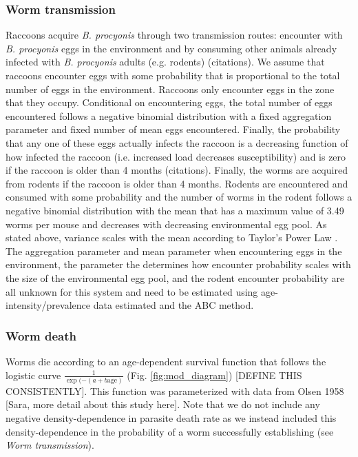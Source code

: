 \documentclass[11pt]{article}
\begin{document}
\subsubsection{Worm transmission}

Raccoons acquire \emph{B. procyonis} through two transmission routes:
encounter with \emph{B. procyonis} eggs in the environment and by
consuming other animals already infected with \emph{B. procyonis} adults
(e.g. rodents) (citations).  We assume that raccoons encounter eggs with some probability that is proportional to the total number of eggs in the environment. Raccoons only encounter eggs in the zone that they occupy. Conditional on encountering eggs, the total number of eggs encountered follows a negative binomial distribution with a fixed aggregation parameter and fixed number of mean eggs encountered.  Finally, the probability that any one of these eggs actually infects the raccoon is a decreasing function of how infected the raccoon (i.e. increased load decreases susceptibility) and is zero if the raccoon is older than 4 months (citations). Finally, the worms are acquired from rodents if the raccoon is older than 4 months.  Rodents are encountered and consumed with some probability and the number of worms in the rodent follows a negative binomial distribution with the mean that has a maximum value of 3.49 worms per mouse and decreases with decreasing environmental egg pool. As stated above, variance scales with the mean according to Taylor's Power Law \citep{Shaw1995}.  The aggregation parameter and mean parameter when encountering eggs in the environment, the parameter the determines how encounter probability scales with the size of the environmental egg pool, and the rodent encounter probability are all unknown for this system and need to be estimated using age-intensity/prevalence data estimated and the ABC method.

\subsubsection{Worm death}

Worms die according to an age-dependent survival function that follows the logistic curve $\frac{1}{\exp(-(a + b \text{age})}$ (Fig. \ref{fig:mod_diagram}) [DEFINE THIS CONSISTENTLY]. This function was parameterized with data from Olsen 1958 [Sara, more detail about this study here].  Note that we do not include any negative density-dependence in parasite death rate as we instead included this density-dependence in the probability of a worm successfully establishing (see \emph{Worm transmission}).
\end{document}
